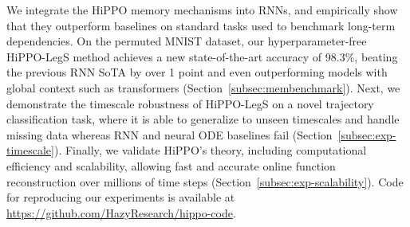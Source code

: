   We integrate the HiPPO memory mechanisms into RNNs, and empirically show that they outperform baselines on standard tasks used to benchmark long-term dependencies.
  On the permuted MNIST dataset, %
  our hyperparameter-free HiPPO-LegS method achieves a new state-of-the-art
  accuracy of 98.3\%,
  beating the previous RNN SoTA by over 1 point and even outperforming models
  with global context such as transformers (Section~\ref{subsec:membenchmark}).
  Next, we demonstrate the timescale robustness of HiPPO-LegS on a novel
  trajectory classification task, where it is able to generalize to unseen
  timescales and handle missing data whereas RNN and neural ODE baselines fail
  (Section~\ref{subsec:exp-timescale}).
  Finally, we validate HiPPO's theory, including computational efficiency and
  scalability, allowing fast and accurate online function reconstruction over
  millions of time steps (Section~\ref{subsec:exp-scalability}).
  Code for reproducing our experiments is available at \url{https://github.com/HazyResearch/hippo-code}.







